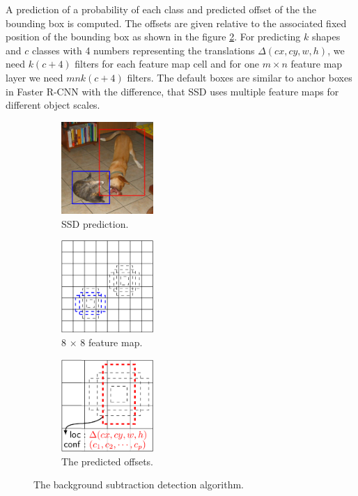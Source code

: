 \documentclass[a4paper,12pt,titlepage, twoside]{article}
\numberwithin{figure}{section}
\begin{document}
A prediction of a probability of each class and predicted offset of the the bounding box is computed. The offsets are given relative to the associated fixed position of the bounding box as shown in the figure \ref{fig:ssd4}. For predicting $k$ shapes and $c$ classes with 4 numbers representing the translations $\Delta(cx, cy, w, h)$, we need $k(c+4)$ filters for each feature map cell and for one $m \times n$ feature map layer we need $mnk(c+4)$ filters. The default boxes are similar to anchor boxes in Faster R-CNN with the difference, that SSD uses multiple feature maps for different object scales. 


\begin{figure}
    \begin{subfigure}[Sample1]{0.3\linewidth}
    	\includegraphics[height=35mm, width=35mm]{fig/ssd_dog_cat.png} 
        \caption{SSD prediction.}
        \label{fig:ssd_detection}   
    \end{subfigure}
    \quad
    \begin{subfigure}[Sample1]{0.3\linewidth} 
    	\includegraphics[height=35mm, width=35mm]{fig/ssd_feature_map.png}
        \caption{8 $\times$ 8 feature map.}   
        \label{fig:ssd4}
    \end{subfigure} 
    \quad
    \begin{subfigure}[Sample1]{0.3\linewidth} 
    	\includegraphics[height=35mm, width=35mm]{fig/ssd_4_feature_map.png}
        \caption{The predicted offsets.}   
        \label{fig:ssd8}
    \end{subfigure} 
    \caption{The background subtraction detection algorithm.}
\end{figure}
\end{document}
